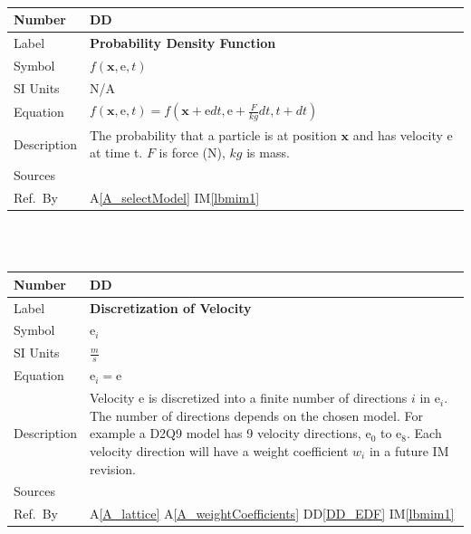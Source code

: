 \documentclass[12pt]{article}
\newcommand{\colAwidth}{0.13\textwidth}
\newcommand{\colBwidth}{0.82\textwidth}
\newcounter{defnum} %
\newcounter{datadefnum} %
\begin{document}
~\newline

\noindent
\begin{minipage}{\textwidth}
	\renewcommand*{\arraystretch}{1.5}
	\begin{tabular}{| p{\colAwidth} | p{\colBwidth}|}
		\hline
		\rowcolor[gray]{0.9}
		Number& DD{datadefnum}\thedatadefnum 
		\label{DD_PDF}\\
		\hline
		Label& \bf Probability Density Function\\
		\hline
		Symbol &$f(\mathrm{\textbf{x}},\mathrm{e},t)$\\
		\hline
		SI Units &N/A \\
		\hline
		Equation& $f(\mathrm{\textbf{x}},\mathrm{e},t) = f(\mathrm{\textbf{x}} +\mathrm{e}dt, \mathrm{e} + \frac{F}{kg}dt, t + dt)$ \\
		\hline
		Description & 
		The probability that a particle is at position $\textbf{x}$ and has velocity $\mathrm{e}$ at time t. $F$ is force ($\mathrm{N}$), $kg$ is mass.\\
		\hline
		Sources& \citet{gibiansky}\\
		\hline
		Ref.\ By & A\ref{A_selectModel} IM\ref{lbmim1}\\
		\hline
	\end{tabular}
\end{minipage}\\

~\newline

\noindent
\begin{minipage}{\textwidth}
	\renewcommand*{\arraystretch}{1.5}
	\begin{tabular}{| p{\colAwidth} | p{\colBwidth}|}
		\hline
		\rowcolor[gray]{0.9}
		Number& DD{datadefnum}\thedatadefnum 
		\label{DD_VELVIR}\\
		\hline
		Label& \bf Discretization of Velocity\\
		\hline
		Symbol &$\mathrm{e}_i$\\
		\hline
		SI Units & $\frac{m}{s}$ \\
		\hline
		Equation& $\mathrm{e}_i = \mathrm{e}$ \\
		\hline
		Description &
		Velocity $\mathrm{e}$ is discretized into a finite number of directions $i$ in $\mathrm{e}_i$. The number of directions depends on the chosen model. For example a D2Q9 model has 9 velocity directions, $\mathrm{e_0}$ to $\mathrm{e_8}$. Each velocity direction will have a weight coefficient ${w_i}$ in a future IM revision.\\
		\hline
		Sources& \citet{gibiansky}\\
		\hline
		Ref.\ By & A\ref{A_lattice} A\ref{A_weightCoefficients} DD\ref{DD_EDF} IM\ref{lbmim1}\\
		\hline
	\end{tabular}
\end{minipage}\\
\end{document}
